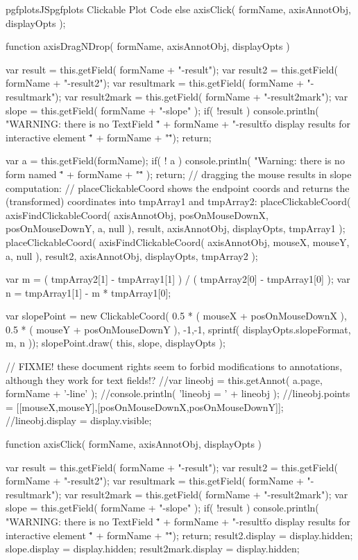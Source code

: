 {{\begin{insDLJS}[processAnnotatedPlot]{pgfplotsJS}{pgfplots Clickable Plot Code}
{{	} else {
		axisClick( formName, axisAnnotObj, displayOpts );
	}
}

function axisDragNDrop( formName, axisAnnotObj, displayOpts )
{
	var result = this.getField( formName + "-result");
	var result2 = this.getField( formName + "-result2");
	var resultmark = this.getField( formName + "-resultmark");
	var result2mark = this.getField( formName + "-result2mark");
	var slope 	= this.getField( formName + "-slope" );
	if( !result ) {
		console.println( "WARNING: there is no TextField \"" + formName + "-result\" to display results for interactive element \"" + formName + "\"");
		return;
	}

	var a = this.getField(formName);
	if( ! a ) {
		console.println( "Warning: there is no form named \"" + formName + "\"" );
		return;
	}
	// dragging the mouse results in slope computation:
	// placeClickableCoord shows the endpoint coords and returns the (transformed) coordinates into tmpArray1 and tmpArray2:
	placeClickableCoord( 
		axisFindClickableCoord( axisAnnotObj, posOnMouseDownX, posOnMouseDownY, a, null ),
		result, axisAnnotObj, displayOpts, tmpArray1 );
	placeClickableCoord( 
		axisFindClickableCoord( axisAnnotObj, mouseX, mouseY, a, null ),
		result2, axisAnnotObj, displayOpts, tmpArray2 );

	var m =  ( tmpArray2[1] - tmpArray1[1] ) / ( tmpArray2[0] - tmpArray1[0] );
	var n =  tmpArray1[1] - m * tmpArray1[0];

	var slopePoint = new ClickableCoord(
		0.5 * ( mouseX + posOnMouseDownX ),
		0.5 * ( mouseY + posOnMouseDownY ),
		-1,-1,
		sprintf( displayOpts.slopeFormat, m, n ));
	slopePoint.draw(
		this,
		slope,
		displayOpts );

	// FIXME! these document rights seem to forbid modifications to annotations, although they work for text fields!?
	//var lineobj = this.getAnnot( a.page, formName + '-line' );
	//console.println( 'lineobj = ' + lineobj );
	//lineobj.points = [[mouseX,mouseY],[posOnMouseDownX,posOnMouseDownY]];
	//lineobj.display = display.visible;
}

function axisClick( formName, axisAnnotObj, displayOpts )
{
	var result = this.getField( formName + "-result");
	var result2 = this.getField( formName + "-result2");
	var resultmark = this.getField( formName + "-resultmark");
	var result2mark = this.getField( formName + "-result2mark");
	var slope 	= this.getField( formName + "-slope" );
	if( !result ) {
		console.println( "WARNING: there is no TextField \"" + formName + "-result\" to display results for interactive element \"" + formName + "\"");
		return;
	}
	result2.display = display.hidden;
	slope.display = display.hidden;
	result2mark.display = display.hidden;

}
\end{insDLJS}}}
